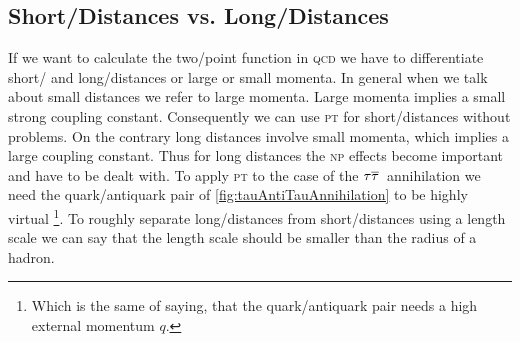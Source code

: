 \documentclass[../../index.tex]{subfiles}
\begin{document}
\subsection{Short\-/Distances vs. Long\-/Distances}
If we want to calculate the two\-/point function in \textsc{qcd} we have to
differentiate short\-/ and long\-/distances or large or small momenta. In
general when we talk about small distances we refer to large momenta. Large
momenta implies a small strong coupling constant. Consequently we can use
\textsc{pt} for short\-/distances without problems. On the contrary long
distances involve small momenta, which implies a large coupling constant. Thus
for long distances the \textsc{np} effects become important and have to be dealt
with. To apply \textsc{pt} to the case of the \(\tau\overline{\tau}\,\) annihilation
we need the quark\-/antiquark pair of \cref{fig:tauAntiTauAnnihilation} to
be highly virtual \footnote{Which is the same of saying, that the
  quark\-/antiquark pair needs a high external momentum \(q\).}. To roughly
separate long\-/distances from short\-/distances using a length scale we can say
that the length scale should be smaller than the radius of a hadron.
\end{document}
